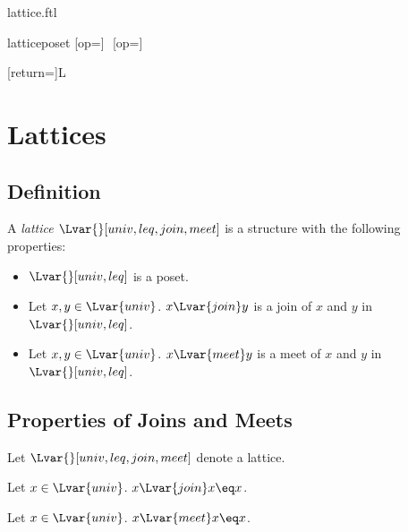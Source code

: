 \documentclass{naproche-library}
\begin{document}
\begin{smodule}{lattice.ftl}


\begin{extstructure}{lattice}{poset}
  [op=\vee]{\,\vee\,}
  [op=\wedge]{\,\wedge\,}
\end{extstructure}

[return={\lattice[comp=##1]}]{\mathcal L}

\section{Lattices}

\subsection{Definition}

\begin{signature*}[forthel,id=LatticeSig,printid]
  A \emph{lattice $\Lvar{}[univ,leq,join,meet]$} is a structure with the following properties:
  
  \begin{itemize}
    \item\label{latticeSig}
      $\Lvar{}[univ,leq]$ is a poset.
    \item\label{latticeJoinSig}
      Let $x,y\in\Lvar{univ}$.
      $x{\Lvar{join}}y$ is a join of $x$ and $y$ in $\Lvar{}[univ,leq]$.
    \item\label{latticeMeetSig}
      Let $x,y\in\Lvar{univ}$.
      $x{\Lvar{meet}}y$ is a meet of $x$ and $y$ in $\Lvar{}[univ,leq]$.
  \end{itemize}
\end{signature*}

\subsection{Properties of Joins and Meets}

\begin{forthel}
  Let $\Lvar{}[univ,leq,join,meet]$ denote a lattice.
\end{forthel}

\begin{proposition*}[forthel,id=JoinIdempotenceThm,printid]
  Let $x\in\Lvar{univ}$.
  $x{\Lvar{join}}x\eq x$.
\end{proposition*}

\begin{proposition*}[forthel,id=MeetIdempotenceThm,printid]
  Let $x\in\Lvar{univ}$.
  $x{\Lvar{meet}}x\eq x$.
\end{proposition*}


\end{smodule}
\end{document}
